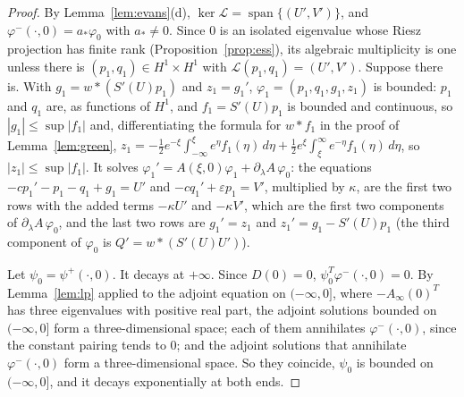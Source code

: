\documentclass[11pt]{article}
\theoremstyle{definition}
\newcommand{\eps}{\varepsilon}
\newcommand{\Lop}{\mathcal{L}}
\begin{document}
\begin{proof}
By Lemma~\ref{lem:evans}(d), $\ker\Lop = \operatorname{span}\{(U', V')\}$, and $\varphi^-(\cdot, 0) = a_*\varphi_0$ with $a_* \ne 0$. Since $0$ is an isolated eigenvalue whose Riesz projection has finite rank (Proposition~\ref{prop:ess}), its algebraic multiplicity is one unless there is $(p_1, q_1) \in H^1 \times H^1$ with $\Lop(p_1, q_1) = (U', V')$. Suppose there is. With $g_1 = w * (S'(U)p_1)$ and $z_1 = g_1'$, $\varphi_1 = (p_1, q_1, g_1, z_1)$ is bounded: $p_1$ and $q_1$ are, as functions of $H^1$, and $f_1 = S'(U)p_1$ is bounded and continuous, so $|g_1| \le \sup|f_1|$ and, differentiating the formula for $w * f_1$ in the proof of Lemma~\ref{lem:green}, $z_1 = -\frac12 e^{-\xi}\int_{-\infty}^{\xi} e^{\eta} f_1(\eta)\, d\eta + \frac12 e^{\xi}\int_{\xi}^{\infty} e^{-\eta} f_1(\eta)\, d\eta$, so $|z_1| \le \sup|f_1|$. It solves $\varphi_1' = A(\xi, 0)\varphi_1 + \partial_\lambda A\,\varphi_0$: the equations $-cp_1' - p_1 - q_1 + g_1 = U'$ and $-cq_1' + \eps p_1 = V'$, multiplied by $\kappa$, are the first two rows with the added terms $-\kappa U'$ and $-\kappa V'$, which are the first two components of $\partial_\lambda A\,\varphi_0$, and the last two rows are $g_1' = z_1$ and $z_1' = g_1 - S'(U)p_1$ (the third component of $\varphi_0$ is $Q' = w * (S'(U)U')$).

Let $\psi_0 = \psi^+(\cdot, 0)$. It decays at $+\infty$. Since $D(0) = 0$, $\psi_0^T\varphi^-(\cdot, 0) = 0$. By Lemma~\ref{lem:lp} applied to the adjoint equation on $(-\infty, 0]$, where $-A_\infty(0)^T$ has three eigenvalues with positive real part, the adjoint solutions bounded on $(-\infty, 0]$ form a three-dimensional space; each of them annihilates $\varphi^-(\cdot, 0)$, since the constant pairing tends to $0$; and the adjoint solutions that annihilate $\varphi^-(\cdot, 0)$ form a three-dimensional space. So they coincide, $\psi_0$ is bounded on $(-\infty, 0]$, and it decays exponentially at both ends.


\end{proof}
\end{document}
